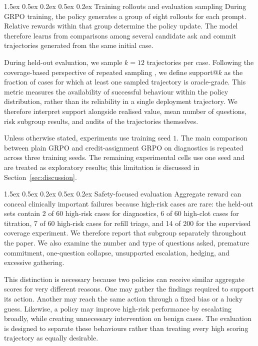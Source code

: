 \documentclass{article}
\makeatletter
\renewcommand{\paragraph}{%
  \@startsection{paragraph}{4}{\z@}%
                {1.5ex \@plus 0.5ex \@minus 0.2ex}%
                {0.5ex \@plus 0.2ex}%
                {\normalsize\bf}}
\makeatother
\begin{document}
\paragraph{Training rollouts and evaluation sampling}
During GRPO training, the policy generates a group of eight rollouts for each
prompt. Relative rewards within that group determine the policy update. The model
therefore learns from comparisons among several candidate ask and commit
trajectories generated from the same initial case.

During held-out evaluation, we sample $k{=}12$ trajectories per case.
Following the coverage-based perspective of repeated sampling
\citep{brown2024monkeys}, we define support@$k$ as the fraction of cases
for which at least one sampled trajectory is oracle-grade. This
metric measures the availability of successful behaviour within the
policy distribution, rather than its reliability in a single
deployment trajectory. We therefore interpret support alongside
realised value, mean number of questions, risk subgroup results,
and audits of the trajectories themselves.

Unless otherwise stated, experiments use training seed $1$. The main comparison
between plain GRPO and credit-assignment GRPO on diagnostics is repeated across
three training seeds. The remaining experimental cells use one seed and are treated
as exploratory results; this limitation is discussed in
Section~\ref{sec:discussion}.

\paragraph{Safety-focused evaluation}
Aggregate reward can conceal clinically important failures because high-risk cases are
rare: the held-out sets contain 2 of 60 high-risk cases for diagnostics, 6 of 60
high-clot cases for titration, 7 of 60 high-risk cases for refill triage, and 14 of 200
for the supervised coverage experiment. We therefore report that subgroup separately throughout the paper. We also examine the
number and type of questions asked, premature commitment, one-question collapse,
unsupported escalation, hedging, and excessive gathering.

This distinction is necessary because two policies can receive similar aggregate
scores for very different reasons. One may gather the findings required to support
its action. Another may reach the same action through a fixed bias or a lucky guess.
Likewise, a policy may improve high-risk performance by escalating broadly, while
creating unnecessary intervention on benign cases. The evaluation is designed to
separate these behaviours rather than treating every high scoring trajectory as
equally desirable.
\end{document}
